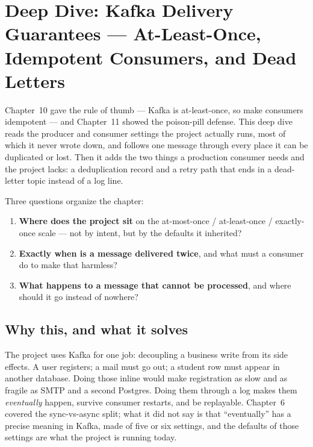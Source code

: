 \chapter{Deep Dive: Kafka Delivery Guarantees --- At-Least-Once, Idempotent Consumers, and Dead Letters}
\label{ch:dd-kafka}

Chapter~10 gave the rule of thumb --- Kafka is at-least-once, so make
consumers idempotent --- and Chapter~11 showed the poison-pill defense.
This deep dive reads the producer and consumer settings the project
actually runs, most of which it never wrote down, and follows one
message through every place it can be duplicated or lost. Then it adds
the two things a production consumer needs and the project lacks: a
deduplication record and a retry path that ends in a dead-letter topic
instead of a log line.

Three questions organize the chapter:

\begin{enumerate}
  \item \textbf{Where does the project sit} on the at-most-once /
  at-least-once / exactly-once scale --- not by intent, but by the
  defaults it inherited?
  \item \textbf{Exactly when is a message delivered twice}, and what
  must a consumer do to make that harmless?
  \item \textbf{What happens to a message that cannot be processed},
  and where should it go instead of nowhere?
\end{enumerate}

\section{Why this, and what it solves}

The project uses Kafka for one job: decoupling a business write from
its side effects. A user registers; a mail must go out; a student row
must appear in another database. Doing those inline would make
registration as slow and as fragile as SMTP and a second Postgres.
Doing them through a log makes them \emph{eventually} happen, survive
consumer restarts, and be replayable. Chapter~6 covered the sync-vs-async
split; what it did not say is that ``eventually'' has a precise
meaning in Kafka, made of five or six settings, and the defaults of
those settings are what the project is running today.

